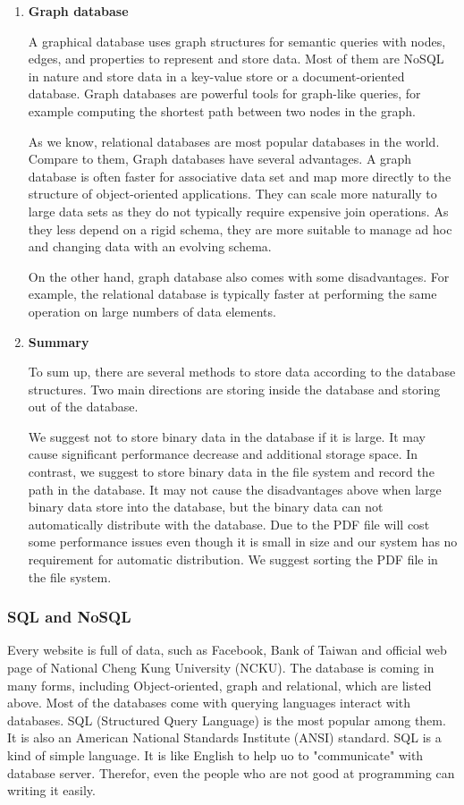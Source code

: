 \begin{enumerate}
	
	\item\textbf{Graph database}
	\setlength{\parindent}{1em}
	
	A graphical database uses graph structures for semantic queries with nodes, edges, and properties to represent and store data. Most of them are NoSQL in nature and store data in a key-value store or a document-oriented database. Graph databases are powerful tools for graph-like queries, for example computing the shortest path between two nodes in the graph.
	
	As we know, relational databases are most popular databases in the world. Compare to them, Graph databases have several advantages. A graph database is often faster for associative data set and map more directly to the structure of object-oriented applications. They can scale more naturally to large data sets as they do not typically require expensive join operations. As they less depend on a rigid schema, they are more suitable to manage ad hoc and changing data with an evolving schema.
	
	On the other hand, graph database also comes with some disadvantages. 
	For example, the relational database is typically faster at performing the same operation on large numbers of data elements.
	
	\item\textbf{Summary}
	\setlength{\parindent}{1em}
	
    To sum up, there are several methods to store data according to the database structures. 
    Two main directions are storing inside the database and storing out of the database.
    
    We suggest not to store binary data in the database if it is large.
    It may cause significant performance decrease and additional storage space.
    In contrast, we suggest to store binary data in the file system and record the path in the database. 
    It may not cause the disadvantages above when large binary data store into the database, but the binary data can not automatically distribute with the database.
    Due to the PDF file will cost some performance issues even though it is small in size and our system has no requirement for automatic distribution.
    We suggest sorting the PDF file in the file system.
	
\end{enumerate}

\subsubsection{SQL and NoSQL}
Every website is full of data, such as Facebook, Bank of Taiwan and official web page of National Cheng Kung University (NCKU).
The database is coming in many forms, including Object-oriented, graph and relational, which are listed above.
Most of the databases come with querying languages interact with databases.
SQL (Structured Query Language) is the most popular among them. 
It is also an American National Standards Institute (ANSI) standard.
SQL is a kind of simple language.
It is like English to help uo to "communicate" with database server.
Therefor, even the people who are not good at programming can writing it easily.
	
